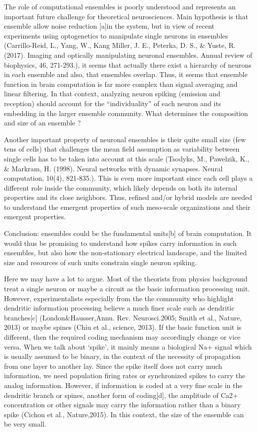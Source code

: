 \documentclass[12pt]{article}
\begin{document}
The role of computational ensembles is poorly understood and represents an important future challenge for theoretical neurosciences. Main hypothesis is that ensemble allow
noise reduction [a]in the system, but in view of recent experiments using optogenetics to manipulate single neurons in ensembles (Carrillo-Reid, L., Yang, W., Kang Miller, J.
E., Peterka, D. S., \& Yuste, R. (2017). Imaging and optically manipulating neuronal ensembles. Annual review of biophysics, 46, 271-293.), it seems that actually there exist a
hierarchy of neurons in each ensemble and also, that ensembles overlap. Thus, it seems that ensemble function in brain computation is far more complex than signal averaging
and linear filtering.
In that context, analyzing neuron spiking (emission and reception) should account for the “individuality” of each neuron and its embedding in the larger ensemble community. 
What determines the composition and size of an ensemble ?

Another important property of neuronal ensembles is their quite small size (few tens of cells) that challenges the mean field assumption as variability between single cells
has to be taken into account at this scale (Tsodyks, M., Pawelzik, K., \& Markram, H. (1998). Neural networks with dynamic synapses. Neural computation, 10(4), 821-835.). This
is even more important since each cell plays a different role inside the community, which likely depends on both its internal properties and its close neighbors. Thus, refined
and/or hybrid models are needed to understand the emergent properties of such meso-scale organizations and their emergent properties.

Conclusion: ensembles could be the fundamental units[b] of brain computation. It would thus be promising to understand how spikes carry information in such ensembles, but also
how the non-stationary electrical landscape, and the limited size and resources of such units constrain single neuron spiking.

Here we may have a lot to argue. Most of the theorists from physics background treat a single neuron or maybe a circuit as the basic information processing unit. However,
experimentalists especially from the the community who highlight dendritic information processing believe a much finer scale such as dendritic branches[c]
(London\&Hausser,Annu. Rev. Neurosci.2005; Smith et al., Nature, 2013) or maybe spines (Chiu et al., science, 2013). If the basic function unit is different, then the required
coding mechanism may accordingly change or vice versa. When we talk about ‘spike’, it mainly means a biological Na+ signal which is usually assumed to be binary, in the
context of the necessity of propagation from one layer to another lay. Since the spike itself does not carry much information, we need population firing rates or synchronized
spikes to carry the analog information. However, if information is coded at a very fine scale in the dendritic branch or spines, another form of coding[d], the amplitude of
Ca2+ concentration or other signals may carry the information rather than a binary spike (Cichon et al., Nature,2015). In this context, the size of the ensemble can be very
small.
\end{document}
